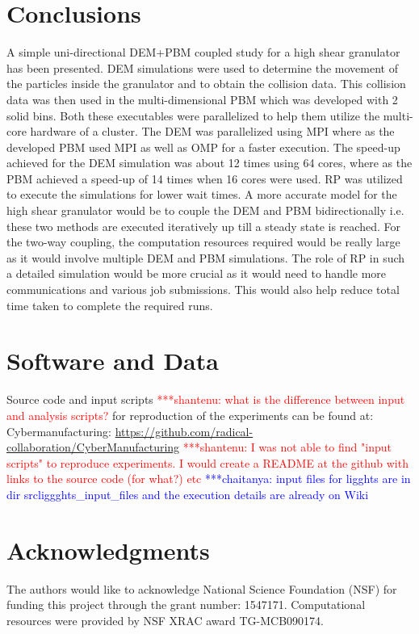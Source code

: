 \documentclass[preprint,11pt,authoryear]{elsarticle}
\newcommand{\jhanote}[1]{ {\textcolor{red} { ***shantenu: #1 }}}
\newcommand{\csnote}[1]{ {\textcolor{blue} { ***chaitanya: #1 }}}
\newcommand{\jhanote}[1]{ {\textcolor{red} { ***shantenu: #1 }}}
\newcommand{\csnote}[1]{}
\begin{document}
\section{Conclusions}
A simple uni-directional DEM+PBM coupled study for a high shear granulator has been 
presented. DEM simulations were used to determine the movement of the particles inside 
the granulator and to obtain the collision data. This collision data was then used in 
the multi-dimensional PBM which was developed with 2 solid bins. Both these executables 
were parallelized to help them utilize the multi-core hardware of a cluster. The DEM 
was parallelized using MPI where as the developed PBM used MPI as well as OMP for a 
faster execution. The speed-up achieved for the DEM simulation was about 12 times using 
64 cores, where as the PBM achieved a speed-up of 14 times when 16 cores were used. 
RP was utilized to execute the simulations for lower wait times. A more accurate 
model for the high shear granulator would be to couple the DEM and PBM bidirectionally 
i.e. these two methods are executed iteratively up till a steady state is reached. 
For the two-way coupling, the computation resources required would be really large 
as it would involve multiple DEM and PBM simulations. The role of RP in such a 
detailed simulation would be more crucial as it would need to handle more 
communications and various job submissions. This would also help reduce 
total time taken to complete the required runs.

\section*{Software and Data}
\noindent Source code and input scripts \jhanote{what is the difference between input and analysis scripts?} for reproduction of the experiments can be found at:\\
Cybermanufacturing: \url{https://github.com/radical-collaboration/CyberManufacturing}
\jhanote{I was not able to find "input scripts" to reproduce experiments. I
would create a README at the github with links to the source code (for what?)
etc} 
\csnote{input files for ligghts are in dir src\/liggghts\_input\_files and the execution details are already on Wiki}


\section*{Acknowledgments}
\noindent The authors would like to acknowledge National Science Foundation (NSF) for 
funding this project through the grant number: 1547171. Computational resources 
were provided by NSF XRAC award TG-MCB090174.
\end{document}

